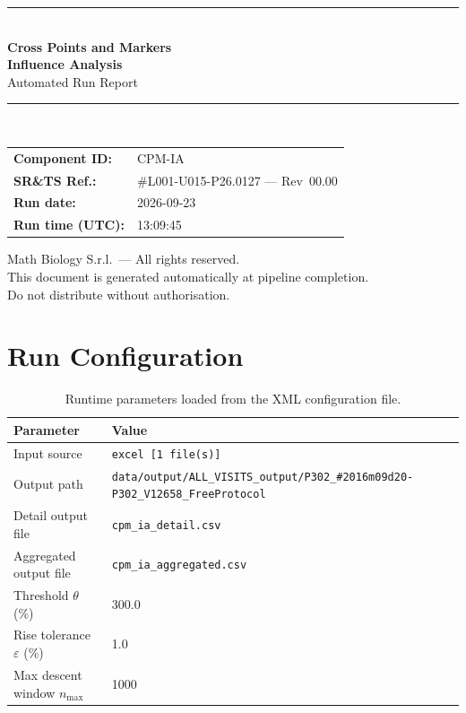 \documentclass[a4paper,11pt]{article}
\begin{document}
\begin{titlepage}
\begin{center}
  \vspace*{1.8cm}
  {\color{dmaaccent}\rule{\linewidth}{1.5pt}}\\[0.6cm]
  {\LARGE\bfseries\color{dmaaccent}
    Cross Points and Markers\\[0.25cm]
    Influence Analysis}\\[0.4cm]
  {\Large Automated Run Report}\\[0.3cm]
  {\color{dmaaccent}\rule{\linewidth}{1.5pt}}\\[2cm]

  \begin{tabular}{ll}
    \textbf{Component ID:}   & CPM-IA \\[0.3cm]
    \textbf{SR\&TS Ref.:}    & \#L001-U015-P26.0127 --- Rev~00.00 \\[0.3cm]
    \textbf{Run date:}       & 2026-09-23 \\[0.3cm]
    \textbf{Run time (UTC):} & 13:09:45 \\
  \end{tabular}

  \vfill
  {\color{dmagray}\small
    Math Biology S.r.l.\ --- All rights reserved.\\
    This document is generated automatically at pipeline completion.\\
    Do not distribute without authorisation.}
\end{center}
\end{titlepage}

\tableofcontents
\clearpage

\section{Run Configuration}

\begin{table}[h!]
\centering
\small
\caption{Runtime parameters loaded from the XML configuration file.}
\begin{tabular}{ll}
\toprule
\textbf{Parameter} & \textbf{Value} \\
\midrule
Input source                      & \texttt{excel [1 file(s)]} \\
Output path                       & \texttt{data/output/ALL\_VISITS\_output/P302\_\#2016m09d20-P302\_V12658\_FreeProtocol} \\
Detail output file                & \texttt{cpm\_ia\_detail.csv} \\
Aggregated output file            & \texttt{cpm\_ia\_aggregated.csv} \\
Threshold $\theta$ (\%)           & 300.0 \\
Rise tolerance $\varepsilon$ (\%) & 1.0 \\
Max descent window $n_{\max}$     & 1000 \\
\bottomrule
\end{tabular}
\end{table}
\end{document}
